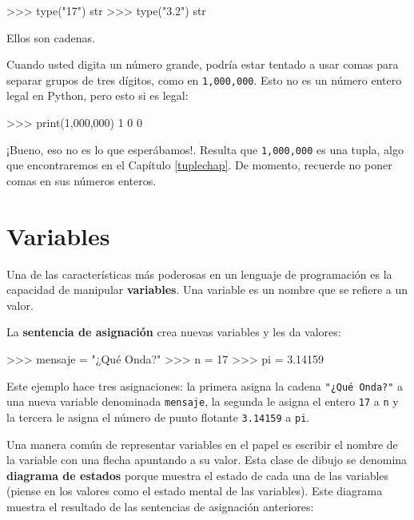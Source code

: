 \begin{pyconcode}
>>> type("17")
str
>>> type("3.2")
str
\end{pyconcode}

Ellos son cadenas.

Cuando usted digita un número grande, podría estar tentado a usar
comas para separar grupos de tres dígitos, como en \texttt{1,000,000}.
Esto no es un número entero legal en Python, pero esto si es legal:

\begin{pyconcode}
>>> print(1,000,000)
1 0 0
\end{pyconcode}

¡Bueno, eso no es lo que esperábamos!. Resulta que \texttt{1,000,000}
es una tupla, algo que encontraremos en el Capítulo \ref{tuplechap}.
De momento, recuerde no poner comas en sus números enteros.

\section{Variables}

  

Una de las características más poderosas en un lenguaje de programación
es la capacidad de manipular \textbf{variables}. Una variable es un
nombre que se refiere a un valor.

La \textbf{sentencia de asignación} crea nuevas variables y les da
valores:

\begin{pyconcode}
>>> mensaje = "¿Qué Onda?"
>>> n = 17
>>> pi = 3.14159
\end{pyconcode}

Este ejemplo hace tres asignaciones: la primera asigna la cadena {\verb+"¿Qué Onda?"+}
a una nueva variable denominada \texttt{mensaje}, la segunda le asigna
el entero \texttt{17} a \texttt{n} y la tercera le asigna el número
de punto flotante \texttt{3.14159} a \texttt{pi}.


Una manera común de representar variables en el papel es escribir
el nombre de la variable con una flecha apuntando a su valor. Esta
clase de dibujo se denomina \textbf{diagrama de estados} porque muestra
el estado de cada una de las variables (piense en los valores como
el estado mental de las variables). Este diagrama muestra el resultado
de las sentencias de asignación anteriores:

